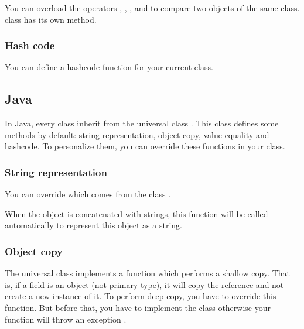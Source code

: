 \documentclass{KodeBook}
\begin{document}
You can overload the operators \keyword{>}, \keyword{<}, \keyword{>=}, \keyword{<=} and \keyword{!=} to compare two objects of the same class.  
 class has its own  method.



\subsubsection{Hash code}

You can define a hashcode function for your current class.

\subsection{Java}

In Java, every class inherit from the universal class . 
This class defines some methods by default: string representation, object copy, value equality and hashcode.
To personalize them, you can override these functions in your class.

\subsubsection{String representation}

You can override  which comes from the class .   



When the object is concatenated with strings, this function will be called automatically to represent this object as a string.



\subsubsection{Object copy}

The universal class  implements a function  which performs a shallow copy.
That is, if a field is an object (not primary type), it will copy the reference and not create a new instance of it. 
To perform deep copy, you have to override this function. 
But before that, you have to implement the class  otherwise your function will throw an exception .
\end{document}
